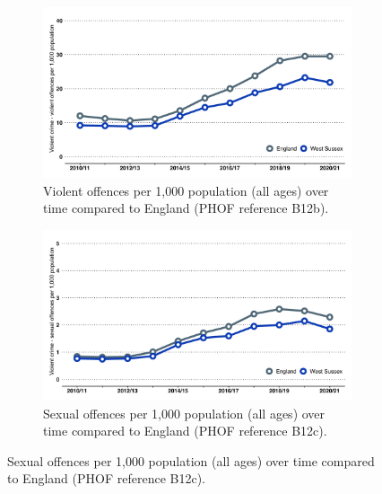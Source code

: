 \begin{figure}
\begin{subfigure}[t]{0.45\textwidth}
    \end{subfigure}
    \begin{subfigure}[t]{0.45\textwidth}
        \caption[Violent offences per 1,000 population (all ages) over time]{Violent offences per 1,000 population (all ages) over time compared to England (PHOF reference B12b).}\label{fig:violence:time}
        \centering
        \includegraphics[width=\textwidth]{images/violent_offenses_line.png}
    \end{subfigure}
    \begin{subfigure}[t]{0.45\textwidth}
        \caption[Sexual offences per 1,000 population (all ages) over time]{Sexual offences per 1,000 population (all ages) over time compared to England (PHOF reference B12c).}\label{fig:sexual_off:time}
        \centering
        \includegraphics[width=\textwidth]{images/sexual_offences_line.png}
    \end{subfigure}
\end{figure}

\clearpage





